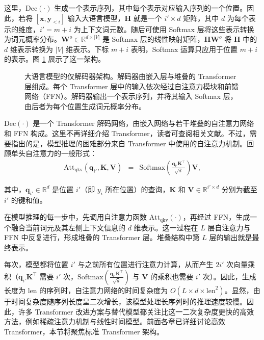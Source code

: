 \noindent 这里，$\mathrm{Dec}(\cdot)$ 生成一个表示序列，其中每个表示对应输入序列的一个位置。因此，若将 $[\mathbf{x},\mathbf{y}_{<i}]$ 输入大语言模型，$\mathbf{H}$ 就是一个 $i' \times d$ 矩阵，其中 $d$ 为每个表示的维度，$i' = m+i$ 为上下文词元数。随后可使用 Softmax 层将这些表示转换为词元概率分布。$\mathbf{W}^{o} \in \mathbb{R}^{d \times |V|}$ 是 Softmax 层的线性映射矩阵，$\mathbf{H} \mathbf{W}^{o}$ 将 $\mathbf{H}$ 中的 $d$ 维表示转换为 $|V|$ 维表示。下标 $m+i$ 表明，Softmax 运算只应用于位置 $m+i$ 的表示。图 \ref{fig:llm-transformer-decoder-achitecture} 展示了这一架构。

\begin{figure}[!t]
\centering

\caption{大语言模型的仅解码器架构。解码器由嵌入层与堆叠的 Transformer 层组成。每个 Transformer 层中的输入依次经过自注意力模块和前馈网络（FFN）。解码器输出一个表示序列，并将其输入 Softmax 层，由后者为每个位置生成词元概率分布。}
\label{fig:llm-transformer-decoder-achitecture}
\end{figure}

$\mathrm{Dec}(\cdot)$ 是一个 Transformer 解码网络，由嵌入网络与若干堆叠的自注意力网络和 FFN 构成。这里不再详细介绍 Transformer，读者可查阅相关文献。不过，需要指出的是，模型推理的困难部分来自 Transformer 中使用的自注意力机制。回顾单头自注意力的一般形式：
\begin{eqnarray}
\mathrm{Att}_{\mathrm{qkv}}(\mathbf{q}_{i'},\mathbf{K},\mathbf{V}) & = & \mathrm{Softmax}(\frac{\mathbf{q}_{i'} \mathbf{K}^{\top}}{\sqrt{d}}) \mathbf{V}, \label{eq:llm-single-head-qkv-attention}
\end{eqnarray}

\noindent 其中，$\mathbf{q}_{i'} \in \mathbb{R}^{d}$ 是位置 $i'$（即 $y_i$ 所在位置）的查询，$\mathbf{K}$ 和 $\mathbf{V} \in \mathbb{R}^{i' \times d}$ 分别为截至 $i'$ 的键和值。

在模型推理的每一步中，先调用自注意力函数 $\mathrm{Att}_{\mathrm{qkv}}(\cdot)$，再经过 FFN，生成一个融合当前词元及其左侧上下文信息的 $d$ 维表示。这一过程在 $L$ 层自注意力与 FFN 中反复进行，形成堆叠的 Transformer 层。堆叠结构中第 $L$ 层的输出就是最终表示。

每次，模型都将位置 $i'$ 与之前所有位置进行注意力计算，从而产生 $2 i'$ 次向量乘积（$\mathbf{q}_{i'} \mathbf{K}^{\top}$ 需要 $i'$ 次，$\mathrm{Softmax}(\frac{\mathbf{q}_{i'} \mathbf{K}^{\top}}{\sqrt{d}})$ 与 $\mathbf{V}$ 的乘积也需要 $i'$ 次）。因此，生成长度为 $\mathrm{len}$ 的序列时，自注意力网络的时间复杂度为 $O(L \times d \times \mathrm{len}^2)$。显然，由于时间复杂度随序列长度呈二次增长，该模型处理长序列时的推理速度较慢。因此，许多 Transformer 改进方案与替代模型都关注比这一二次复杂度更快的高效方法，例如稀疏注意力机制与线性时间模型。前面各章已详细讨论高效 Transformer，本节将聚焦标准 Transformer 架构。

